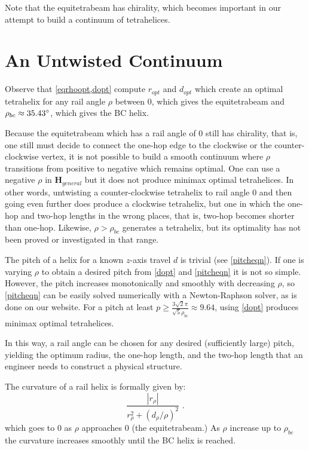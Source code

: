 \documentclass[10pt,final]{journals-1.0/asme2ej}
\renewcommand{\vec}[1]{\mathbf{#1}}
\begin{document}
Note that the equitetrabeam has chirality, which becomes important in our attempt to build a
continuum of tetrahelices.

\section{An Untwisted Continuum}
\label{sec:continuum}


Observe that  \cref{eqrhoopt,dopt} compute $r_{opt}$ and $d_{opt}$ which
create an optimal tetrahelix for any rail angle $\rho$ between $0$, which
gives the equitetrabeam and
$\rho_{bc} \approx 35.43 \degree$, which gives the BC helix.

 Because the equitetrabeam which has a rail angle of $0$ still has
 chirality, that is, one still must decide to connect the one-hop edge to
 the clockwise or the counter-clockwise vertex, it is not possible to build
 a smooth continuum where $\rho$ transitions from positive to negative
 which remains optimal. One can use a negative $\rho$ in $\vec{H}_{general}$
 but it does not produce minimax optimal tetrahelices. In other words,
 untwisting a counter-clockwise tetrahelix to rail angle $0$ and then going
even further does produce a clockwise tetrahelix, but one in which the
 one-hop and two-hop lengths in the wrong places, that is, two-hop
 becomes shorter than one-hop.
 Likewise, $\rho > \rho_{bc}$ generates
 a tetrahelix, but its optimality has not been proved or investigated in that range.
 
 The pitch of a helix for a known $z$-axis travel $d$
 is trivial (see \cref{pitcheqn}).
If one is varying $\rho$ to obtain a desired pitch
from \cref{dopt} and \cref{pitcheqn} it is not so simple.
However, the pitch increases monotonically and smoothly with decreasing $\rho$, so
\cref{pitcheqn} can be easily solved numerically with a Newton-Raphson
solver, as is done on our website.
For a pitch at least $ p \geq \frac{3  \sqrt{2}  \pi}{\sqrt{5}\rho_{bc}} \approx 9.64 $,
using \cref{dopt} produces minimax optimal tetrahelices.

In this way, a rail angle can be chosen for any desired (sufficiently large) pitch, yielding
the optimum radius, the one-hop length, and the two-hop length that an engineer needs to
construct a physical structure.

The curvature of a rail helix is formally given by:
\begin{equation}
  \frac{|r_{\rho}|}{r_{\rho}^2 + (d_{\rho}/\rho)^2} \text{ .}
\end{equation}
which goes to $0$ as $\rho$ approaches $0$ (the equitetrabeam.)
As $\rho$ increase up to $\rho_{bc}$ the curvature increases smoothly until the BC helix is reached.
\end{document}
